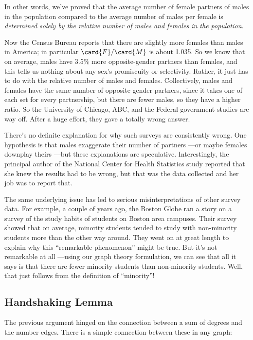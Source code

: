 In other words, we've proved that the average number of female partners of
males in the population compared to the average number of males per
female is \emph{determined solely by the relative number of males and
females in the population}.

Now the Census Bureau reports that there are slightly more females than
males in America; in particular $\card{F} / \card{M}$ is about 1.035.  So
we know that on average, males have 3.5\% more opposite-gender partners
than females, and this tells us nothing about any sex's promiscuity or
selectivity.  Rather, it just has to do with the relative number of males
and females.  Collectively, males and females have the same number of
opposite gender partners, since it takes one of each set for every
partnership, but there are fewer males, so they have a higher ratio.  So the
University of Chicago, ABC, and the Federal government studies are way
off.  After a huge effort, they gave a totally wrong answer.

There's no definite explanation for why such surveys are consistently
wrong.  One hypothesis is that males exaggerate their number of partners
---or maybe females downplay theirs ---but these explanations are
speculative.  Interestingly, the principal author of the National Center
for Health Statistics study reported that she knew the results had to be
wrong, but that was the data collected and her job was to report that.

The same underlying issue has led to serious misinterpretations of other
survey data.  For example, a couple of years ago, the Boston Globe ran a
story on a survey of the study habits of students on Boston area campuses.
Their survey showed that on average, minority students tended to study
with non-minority students more than the other way around.  They went on
at great length to explain why this ``remarkable phenomenon'' might be
true.  But it's not remarkable at all ---using our graph theory
formulation, we can see that all it says is that there are fewer minority
students than non-minority students.  Well, that just follows from the
definition of ``minority''!

\subsection{Handshaking Lemma}

The previous argument hinged on the connection between a sum of degrees
and the number edges.  There is a simple connection between these in any
graph:

